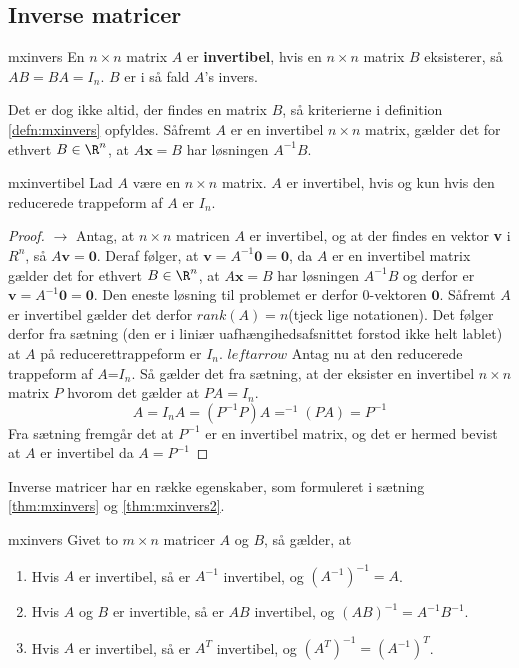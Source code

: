 \subsection{Inverse matricer}

\begin{defn}{}{mxinvers}
En $n \times n$ matrix $A$ er \textbf{invertibel}, hvis en $n \times n$ matrix $B$ eksisterer, så $AB=BA=I_n$. $B$ er i så fald $A$'s invers. 
\end{defn}
Det er dog ikke altid, der findes en matrix $B$, så kriterierne i definition \ref{defn:mxinvers} opfyldes. 
Såfremt $A$ er en invertibel $n \times n$ matrix, gælder det for ethvert $B \in \R^n$, at $A\textbf{x}=B$ har løsningen $A^{-1}B$.
%
\begin{thm}{}{mxinvertibel}
Lad $A$ være en $n \times n$ matrix. 
$A$ er invertibel, hvis og kun hvis den reducerede trappeform af $A$ er $I_n$.
\end{thm}
%
\begin{proof}
$\rightarrow$ Antag, at $n\times n$ matricen $A$ er invertibel, og at der findes en vektor \textbf{v} i $R^n$, så $A\textbf{v}=\textbf{0}$. 
Deraf følger, at $\textbf{v}=A^{-1}\textbf{0}=\textbf{0}$, da $A$ er en invertibel matrix gælder det for ethvert $B \in \R^n$, at $A\textbf{x}=B$ har løsningen $A^{-1}B$ og derfor er $\textbf{v}=A^{-1}\textbf{0}=\textbf{0}$. 
Den eneste løsning til problemet er derfor $0$-vektoren $\textbf{0}$. 
Såfremt $A$ er invertibel gælder det derfor $rank(A)=n$(tjeck lige notationen).
Det følger derfor fra sætning (den er i liniær uafhængihedsafsnittet forstod ikke helt lablet) at $A$ på reducerettrappeform er $I_n$.
$leftarrow$
Antag nu at den reducerede trappeform af $A$=$I_n$. 
Så gælder det fra sætning, at der eksister en invertibel $n \times n$ matrix $P$ hvorom det gælder at $PA=I_n$.
$$A=I_nA=(P^{-1}P)A=^{-1}(PA)=P^{-1}$$
Fra sætning fremgår det at $P^{-1}$ er en invertibel matrix, og det er hermed bevist at $A$ er invertibel da $A=P^{-1}$

\end{proof}
Inverse matricer har en række egenskaber, som formuleret i sætning \ref{thm:mxinvers} og \ref{thm:mxinvers2}. 
%
\begin{thm}{}{mxinvers}
Givet to $m \times n$ matricer $A$ og $B$, så gælder, at
\begin{enumerate}[label=(\alph*)]
\item Hvis $A$ er invertibel, så er $A^{-1}$ invertibel, og $(A^{-1})^{-1}=A$.
\item Hvis $A$ og $B$ er invertible, så er $AB$ invertibel, og $(AB)^{-1}=A^{-1}B^{-1}$.
\item Hvis $A$ er invertibel, så er $A^T$ invertibel, og $(A^T)^{-1}=(A^{-1})^T$.
\end{enumerate}
\end{thm}
